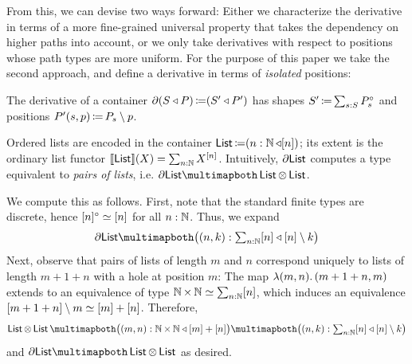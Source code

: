 From this, we can devise two ways forward:
Either we characterize the derivative in terms of a more fine-grained universal property
that takes the dependency on higher paths into account,
or we only take derivatives with respect to positions whose path types are more uniform.
For the purpose of this paper we take the second approach,
and define a derivative in terms of \emph{isolated} positions:
\begin{definition}
  The derivative of a container \( \partial{(S\mathbin{\triangleleft}P)} \operatorname{\mathrel{\coloneq}} (S'\mathbin{\triangleleft}P') \)
  has shapes \( S' \operatorname{\mathrel{\coloneq}} \sum_{s : S} P_s^{\circ} \) and positions \( P'(s , p) \operatorname{\mathrel{\coloneq}} P_s \setminus p \).
\end{definition}
\begin{example}
  Ordered lists are encoded in the container \( \operatorname{\mathsf{List}} \operatorname{\mathrel{\coloneq}} (n : \operatorname{\mathbb{N}}\mathbin{\triangleleft}\lbrack n\rbrack) \);
  its extent is the ordinary list functor \( \llbracket\operatorname{\mathsf{List}}\rrbracket(X) = \sum_{n : \operatorname{\mathbb{N}}} X^{\lbrack n\rbrack} \).
  Intuitively, \( \partial{\operatorname{\mathsf{List}}} \) computes a type equivalent to \emph{pairs of lists},
  i.e. \( \Der{\List} \CartEquiv \List \CTimes \List \).

  We compute this as follows.
  First, note that the standard finite types are discrete, hence \( \lbrack n\rbrack^{\circ} \simeq \lbrack n\rbrack \) for all \( n : \operatorname{\mathbb{N}} \).
  Thus, we expand
  \[
    \Der{\List} \CartEquiv \bigl( \MkCont{ (n, k) : {\textstyle \sum_{n : \Nat} \Fin{n}} }{ {\Fin{n} \setminus k} } \bigr)
  \]
  Next, observe that pairs of lists of length \( m \) and \( n \) correspond uniquely to lists of length \( m + 1 + n \) with a hole at position \( m \):
  The map \( \lambda (m, n).\, (m + 1 + n, m) \) extends to an equivalence of type \( \operatorname{\mathbb{N}} \times \operatorname{\mathbb{N}} \simeq \sum_{n : \operatorname{\mathbb{N}}} \lbrack n\rbrack \),
  which induces an equivalence
  \(
    \lbrack m + 1 + n\rbrack \setminus m \simeq \lbrack m\rbrack + \lbrack n\rbrack
  \).
  Therefore,
  \[
    \List \CTimes \List
      \CartEquiv
    \bigl( \MkCont{ (m, n) : {\Nat \times \Nat} }{ {\Fin{m} + \Fin{n}} } \bigr)
      \CartEquiv
    \bigl( \MkCont{ (n, k) : {\textstyle \sum_{n : \Nat} \Fin{n}} }{ {\Fin{n} \setminus k} } \bigr)
  \]
  and
  \( \Der{\List} \CartEquiv \List \CTimes \List \) as desired.
\end{example}


